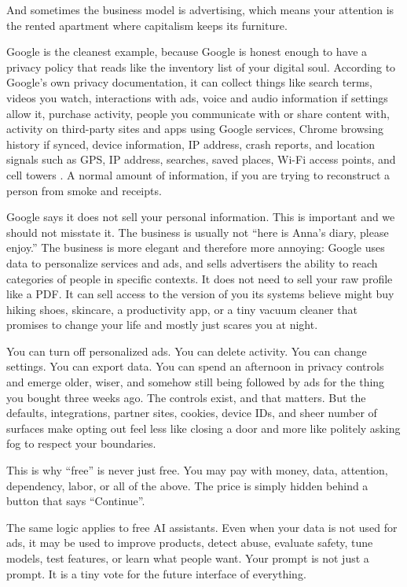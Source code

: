 \documentclass[12pt,oneside]{book}
\begin{document}
And sometimes the business model is advertising, which means your attention is the rented apartment where capitalism keeps its furniture.

Google is the cleanest example, because Google is honest enough to have a privacy policy that reads like the inventory list of your digital soul. According to Google's own privacy documentation, it can collect things like search terms, videos you watch, interactions with ads, voice and audio information if settings allow it, purchase activity, people you communicate with or share content with, activity on third-party sites and apps using Google services, Chrome browsing history if synced, device information, IP address, crash reports, and location signals such as GPS, IP address, searches, saved places, Wi-Fi access points, and cell towers \parencite{googleprivacy2026,googleads2026}. A normal amount of information, if you are trying to reconstruct a person from smoke and receipts.

Google says it does not sell your personal information. This is important and we should not misstate it. The business is usually not ``here is Anna's diary, please enjoy.'' The business is more elegant and therefore more annoying: Google uses data to personalize services and ads, and sells advertisers the ability to reach categories of people in specific contexts. It does not need to sell your raw profile like a PDF. It can sell access to the version of you its systems believe might buy hiking shoes, skincare, a productivity app, or a tiny vacuum cleaner that promises to change your life and mostly just scares you at night.

You can turn off personalized ads. You can delete activity. You can change settings. You can export data. You can spend an afternoon in privacy controls and emerge older, wiser, and somehow still being followed by ads for the thing you bought three weeks ago. The controls exist, and that matters. But the defaults, integrations, partner sites, cookies, device IDs, and sheer number of surfaces make opting out feel less like closing a door and more like politely asking fog to respect your boundaries.

This is why ``free'' is never just free. You may pay with money, data, attention, dependency, labor, or all of the above. The price is simply hidden behind a button that says ``Continue''.

The same logic applies to free AI assistants. Even when your data is not used for ads, it may be used to improve products, detect abuse, evaluate safety, tune models, test features, or learn what people want. Your prompt is not just a prompt. It is a tiny vote for the future interface of everything.
\end{document}
